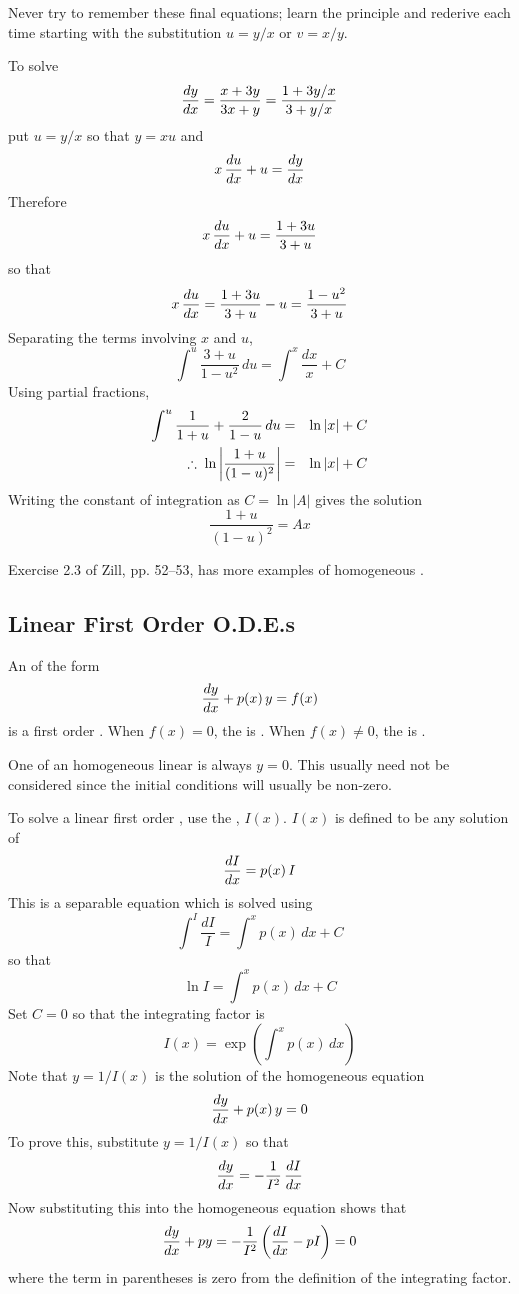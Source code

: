 Never try to remember these final equations; learn the principle and
rederive each time starting with the substitution $u=y/x$ or $v=x/y$.

\begin{example}
To solve
$$\frac{dy}{dx}=\frac{x+3y}{3x+y}=\frac{1+3y/x}{3+y/x}$$
put $u=y/x$ so that $y=xu$ and
$$x\,\frac{du}{dx}+u=\frac{dy}{dx}$$
Therefore
$$x\,\frac{du}{dx}+u=\frac{1+3u}{3+u}$$
so that
$$x\,\frac{du}{dx}=\frac{1+3u}{3+u}-u=\frac{1-u^2}{3+u}$$
Separating the terms involving $x$ and $u$,
$$\int^u\frac{3+u}{1-u^2}\,du=\int^x\frac{dx}{x}+C$$
Using partial fractions,
\begin{eqnarray*}
\int^u \frac{1}{1+u}+\frac{2}{1-u}\,du&=&\ln\left|x\right|+C\\
\;\therefore\; \ln\left|\frac{1+u}{(1-u)^2}\right|&=&\ln\left|x\right|+C
\end{eqnarray*}
Writing the constant of integration as $C=\ln\left|A\right|$ gives the solution
$$\frac{1+u}{(1-u)^2}=Ax$$
\end{example}

\begin{exercise}
Exercise 2.3 of Zill, pp. 52--53, has more examples of homogeneous \ODEs.
\end{exercise}

\subsection{Linear First Order O.D.E.s}

An \ODE of the form
$$\frac{dy}{dx}+p(x)\,y=f(x)$$
is a  first order \ODE.  When $f(x)=0$, the \ODE is
.  When $f(x)\neq 0$, the \ODE is .

One  of an homogeneous linear \ODE is always
$y=0$.  This usually need not be considered since the initial conditions will
usually be non-zero.

To solve a linear first order \ODE, use the ,
$I(x)$.  $I(x)$ is defined to be any solution of 
$$\frac{dI}{dx}=p(x)\,I$$
This is a separable equation which is solved using
$$\int^I\frac{dI}{I}=\int^x p(x)\,dx+C$$
so that
$$\ln I=\int^x p(x)\,dx+C$$
Set $C=0$ so that the integrating factor is
$$I(x)=\exp\left(\int^x p(x)\,dx\right)$$
Note that $y=1/I(x)$ is the solution of the homogeneous equation
$$\frac{dy}{dx}+p(x)\,y=0$$
To prove this, substitute $y=1/I(x)$ so that
$$\frac{dy}{dx}=-\frac{1}{I^2}\,\frac{dI}{dx}$$
Now substituting this into the homogeneous equation shows that
$$\frac{dy}{dx}+py=-\frac{1}{I^2}\left(\frac{dI}{dx}-pI\right)=0$$
where the term in parentheses is zero from the definition of the integrating
factor.

